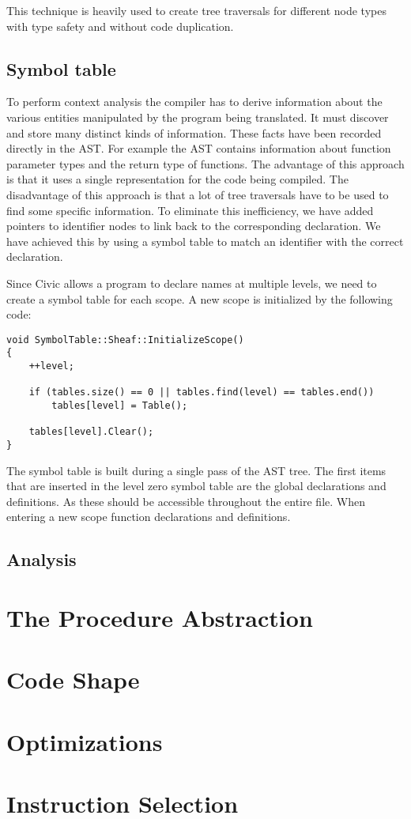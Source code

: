 \documentclass[12pt]{article}
\begin{document}
This technique is heavily used to create tree traversals for different node types with type safety and without code duplication.

\subsection{Symbol table}

To perform context analysis the compiler has to derive information about the various entities manipulated by the program being translated. It must discover and store many distinct kinds of information. These facts have been recorded directly in the AST. For example the AST contains information about function parameter types and the return type of functions. The advantage of this approach is that it uses a single representation for the code being compiled. The disadvantage of this approach is that a lot of tree traversals have to be used to find some specific information. To eliminate this inefficiency, we have added pointers to identifier nodes to link back to the corresponding declaration. We have achieved this by using a symbol table to match an identifier with the correct declaration.

Since Civic allows a program to declare names at multiple levels, we need to create a symbol table for each scope. A new scope is initialized by the following code:

\begin{lstlisting}
void SymbolTable::Sheaf::InitializeScope()
{
	++level;

	if (tables.size() == 0 || tables.find(level) == tables.end())
		tables[level] = Table();
	
	tables[level].Clear();
}
\end{lstlisting}

The symbol table is built during a single pass of the AST tree. The first items that are inserted in the level zero symbol table are the global declarations and definitions. As these should be accessible throughout the entire file. When entering a new scope function declarations and definitions.  

\subsection{Analysis}


\section{The Procedure Abstraction}

\section{Code Shape}

\section{Optimizations}

\section{Instruction Selection}

\newpage



\end{document}
